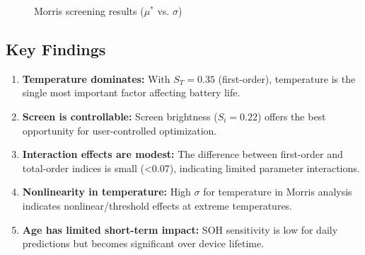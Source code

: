 \begin{figure}[H]
\centering
{}
\caption{Morris screening results ($\mu^*$ vs. $\sigma$)}
\label{fig:morris}
\end{figure}

\subsection{Key Findings}

\begin{enumerate}
    \item \textbf{Temperature dominates:} With $S_T = 0.35$ (first-order), temperature is the single most important factor affecting battery life.
    
    \item \textbf{Screen is controllable:} Screen brightness ($S_i = 0.22$) offers the best opportunity for user-controlled optimization.
    
    \item \textbf{Interaction effects are modest:} The difference between first-order and total-order indices is small (<0.07), indicating limited parameter interactions.
    
    \item \textbf{Nonlinearity in temperature:} High $\sigma$ for temperature in Morris analysis indicates nonlinear/threshold effects at extreme temperatures.
    
    \item \textbf{Age has limited short-term impact:} SOH sensitivity is low for daily predictions but becomes significant over device lifetime.
\end{enumerate}
